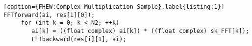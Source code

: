 \lstset{framesep=-10pt, xleftmargin=-10pt}
\begin{lstlisting}[caption={FHEW:Complex Multiplication Sample},label{listing:1}]
FFTforward(ai, res[i][0]);
     for (int k = 0; k < N2; ++k) 
        ai[k] = ((float complex) ai[k]) * ((float complex) sk_FFT[k]);
        FFTbackward(res[i][1], ai);
\end{lstlisting}

